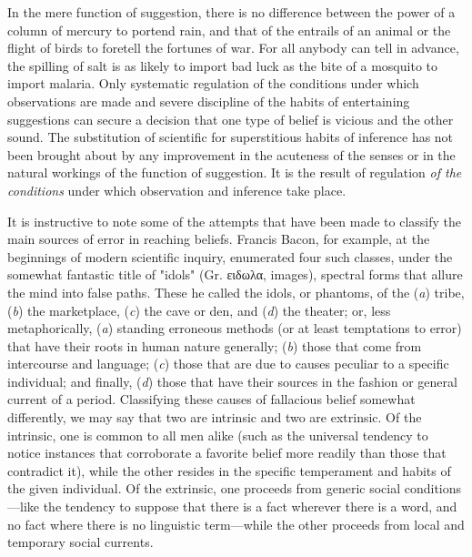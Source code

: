 \documentclass[letterpaper]{book}
\begin{document}

In the mere function of suggestion, there is no difference between the
power of a column of mercury to portend rain, and that of the entrails
of an animal or the flight of birds to foretell the fortunes of war. For
all anybody can tell in advance, the spilling of salt is as likely to
import bad luck as the bite of a mosquito to import malaria. Only
systematic regulation of the conditions under which observations are
made and severe discipline of the habits of entertaining suggestions can
secure a decision that one type of belief is vicious and the other
sound. The substitution of scientific for superstitious habits of
inference has not been brought about by any improvement in the acuteness
of the senses or in the natural workings of the function of suggestion.
It is the result of regulation \emph{of the conditions} under which
observation and inference take
place.


It is instructive to note some of the attempts that have been made to
classify the main sources of error in reaching beliefs. Francis Bacon,
for example, at the beginnings of modern scientific inquiry, enumerated
four such classes, under the somewhat fantastic title of "idols" (Gr.
\textgreek{ειδωλα}, images), spectral forms that allure the mind into
false paths. These he called the idols, or phantoms, of the (\emph{a})
tribe, (\emph{b}) the marketplace, (\emph{c}) the cave or den, and
(\emph{d}) the theater; or, less metaphorically, (\emph{a}) standing
erroneous methods (or at least temptations to error) that have their
roots in human nature generally; (\emph{b}) those that come from
intercourse and language; (\emph{c}) those that are due to causes
peculiar to a specific individual; and finally, (\emph{d}) those that
have their sources in the fashion or general current of a period.
Classifying these causes of fallacious belief somewhat differently, we
may say that two are intrinsic and two are extrinsic. Of the intrinsic,
one is common to all men alike (such as the universal tendency to notice
instances that corroborate a favorite belief more readily than those
that contradict it), while the other resides in the specific temperament
and habits of the given individual. Of the extrinsic, one proceeds from
generic social conditions---like the tendency to suppose that there is a
fact wherever there is a word, and no fact where there is no linguistic
term---while the other proceeds from local and temporary social
currents.
\end{document}

